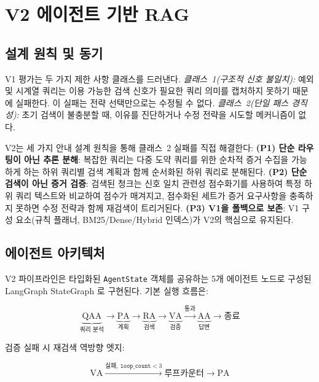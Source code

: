 \documentclass[11pt, a4paper]{article}
\begin{document}
\section{V2 에이전트 기반 RAG}
\label{sec:v2}

\subsection{설계 원칙 및 동기}

V1 평가는 두 가지 제한 사항 클래스를 드러낸다. \emph{클래스~1(구조적 신호 불일치):} 예외 및 시계열 쿼리는 이용 가능한 검색 신호가 필요한 쿼리 의미를 캡처하지 못하기 때문에 실패한다. 이 실패는 전략 선택만으로는 수정될 수 없다. \emph{클래스~2(단일 패스 경직성):} 초기 검색이 불충분할 때, 이유를 진단하거나 수정 전략을 시도할 메커니즘이 없다.

V2는 세 가지 안내 설계 원칙을 통해 클래스~2 실패를 직접 해결한다: \textbf{(P1) 단순 라우팅이 아닌 추론 분해}: 복잡한 쿼리는 다중 도약 쿼리를 위한 순차적 증거 수집을 가능하게 하는 하위 쿼리별 검색 계획과 함께 순서화된 하위 쿼리로 분해된다. \textbf{(P2) 단순 검색이 아닌 증거 검증}: 검색된 청크는 신호 일치 관련성 점수화기를 사용하여 특정 하위 쿼리 텍스트와 비교하여 점수가 매겨지고, 점수화된 세트가 증거 요구사항을 충족하지 못하면 수정 전략과 함께 재검색이 트리거된다. \textbf{(P3) V1을 폴백으로 보존}: V1 구성 요소(규칙 플래너, BM25/Dense/Hybrid 인덱스)가 V2의 핵심으로 유지된다.

\subsection{에이전트 아키텍처}

V2 파이프라인은 타입화된 \texttt{AgentState} 객체를 공유하는 5개 에이전트 노드로 구성된 LangGraph StateGraph \citep{langgraph2024}로 구현된다. 기본 실행 흐름은:

\begin{equation*}
\underbrace{\text{QAA}}_{\text{쿼리 분석}} \to
\underbrace{\text{PA}}_{\text{계획}} \to
\underbrace{\text{RA}}_{\text{검색}} \to
\underbrace{\text{VA}}_{\text{검증}}
\xrightarrow{\text{통과}} \underbrace{\text{AA}}_{\text{답변}} \to \text{종료}
\end{equation*}

\noindent 검증 실패 시 재검색 역방향 엣지:

\begin{equation*}
\text{VA} \xrightarrow{\text{실패},\ \texttt{loop\_count} < 3} \text{루프카운터} \to \text{PA}
\end{equation*}
\end{document}
